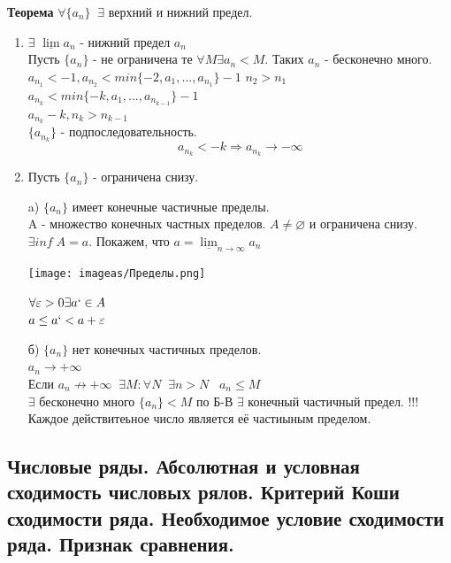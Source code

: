 \documentclass[12pt, a4paper]{article}
\newcommand{\eps}{\varepsilon}
\begin{document}
\begin{centering}
\textbf{Теорема} $\forall \{a_n\} \;\; \exists$ верхний и нижний предел.
\begin{tcolorbox}
    \begin{enumerate}
        \item $\exists$ $\underline{\lim} a_n$ - нижний предел $a_n$\\
        Пусть $\{a_n\}$ - не ограничена те $\forall M \exists a_n < M$. Таких $a_n$ - бесконечно много.\\
        $a_{n_1} < -1, a_{n_2} < min\{ -2, a_1, ..., a_{n_1} \} - 1$
        $n_2 > n_1$\\
        $a_{n_k} < min\{-k, a_1, ..., a_{n_{k-1}}\} - 1$\\
        $a_{n_k} - k, n_k > n_{k-1}$\\
        $\{a_{n_k}\}$ - подпоследовательность.\\
        \[ a_{n_k} < -k \Rightarrow a_{n_k} \to -\infty \]
        \item Пусть $\{ a_n \}$ - ограничена снизу.
            \item[a)] $\{a_n\}$  имеет конечные частичные пределы.\\
            A - множество конечных частных пределов. $A \not= \varnothing$ и ограничена снизу.\\
            $\exists inf\; A = a$. Покажем, что $a = \underline{\lim}_{n\to\infty} a_n$
            \begin{center}
                \texttt{[image: imageas/Пределы.png]}
            \end{center}
            $ \forall \eps > 0 \exists a` \in A $\\
            $a \leq a` < a+\eps$
            \item[б)] $\{a_n\}$ нет конечных частичных пределов.\\
            $a_n \to +\infty$\\
            Если $a_n \not\to +\infty \;\; \exists M: \forall N \;\; \exists n > N\;\;\; a _n\leq M$ \\
            $\exists$ бесконечно много $\{a_n\} < M$ по Б-В $\exists$ конечный частичный предел.
    !!! Каждое действитеьное число является её частиыным пределом.
    \end{enumerate}
\end{tcolorbox}

\subsection{Числовые ряды. Абсолютная и условная сходимость числовых рялов. Критерий Коши сходимости ряда. Необходимое условие сходимости ряда. Признак сравнения.}


\end{centering}
\end{document}
